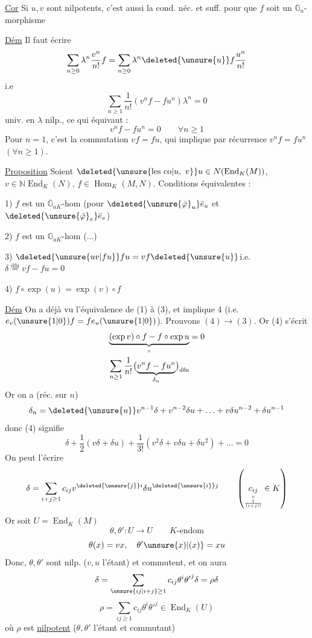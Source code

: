 \uline{Cor} Si $u,v$  sont nilpotents, c'est aussi la cond. néc. et suff. pour que $f$ soit un $\mathbb G_a$-morphisme

\uline{Dém} Il faut écrire
\[
\sum_{n\geq0}\lambda^n\frac{v^n}{n!}f
=\sum_{n\geq0}\lambda^n\deleted{\unsure{u}}f\frac{u^n}{n!}
\]
i.e
\[
\sum_{n\geq1}\frac1{n!}(v^nf-fu^n)\lambda^n=0
\]
univ. en $\lambda$ nilp., ce qui équivaut :
\[
v^nf-fu^n=0\qquad \forall n\geq1
\]
Pour $n=1$, c'est la commutation $vf=fu$, qui implique par récurrence $v^nf=fu^n$ $(\forall n\geq1)$.

\uline{Proposition} Soient $\deleted{\unsure{\text{les co}|u,\ v}}u\in N(\operatorname{End}_K(M))$, $v\in\mathbb N\operatorname{End}_K(N)$, $f\in\operatorname{Hom}_K(M,N)$. Conditions équivalentes :

1) $f$ est un $\overline{\mathbb G}_{aK}$-hom (pour  $\deleted{\unsure{\bar\varphi}_u}\bar e_u$ et $\deleted{\unsure{\bar\varphi}_v}\bar e_v$)

2) $f$ est un $\mathbb G_{aK}$-hom ($\ldots$)

3) $\deleted{\unsure{uv|fu}}fu=vf\deleted{\unsure{u}}$\quad i.e. $\delta\overset{\mathrm{dfn}}=vf-fu=0$

4) $f\circ\exp(u)=\exp(v)\circ f$

\uline{Dém} On a déjà vu l'équivalence de (1) à (3), et  implique 4 (i.e. $e_v(\unsure{1|0})f=fe_u(\unsure{1|0})$). Prouvons $(4)\longrightarrow(3)$. Or (4) s'écrit
\[
\begin{aligned}
\underbrace{(\exp v)\circ f-f\circ\exp u}_{\shortparallel}&=0\\
\sum_{n\geq1}\frac1{n!}\bigl(\underbrace{v^nf-fu^n}_{\delta_n}\bigr)_{\mathrm{dfn}}&
\end{aligned}
\]
Or on a (réc. sur $n$)
\[
\delta_n=\deleted{\unsure{u}}v^{n-1}\delta+v^{n-2}\delta u+\ldots+v\delta u^{n-2}+\delta u^{n-1}
\]
donc (4) signifie
\[
\delta+\frac12(v\delta+\delta u)+\frac1{3!}(v^2\delta+v\delta u+\delta u^2)+\ldots=0
\]
On peut l'écrire
\[
\delta=\sum_{i+j\geq1}c_{ij}v^{\deleted{\unsure{j}}i}\delta u^{\deleted{\unsure{i}}j}
\qquad\left(\underset{\substack{\shortparallel\\\frac1{(i+j)!}}}{c_{ij}}\in K\right)
\]
Or soit $U=\operatorname{End}_K(M)$
\[
\theta,\theta':U\longrightarrow U\qquad K\text{-endom}
\]
\[
\theta(x)=vx,\quad \theta'\unsure{x)|{(x)}}=xu
\]
Donc, $\theta,\theta'$ sont nilp.  ($v,u$ l'étant) et commutent, et on aura
\[
\delta=\sum_{\unsure{ij|i+j}\geq1}c_{ij}\theta^i{\theta'}^j\delta=\rho\delta
\]
\[
\rho=\sum_{ij\geq1}c_{ij}\theta^i{\theta'}^j\in\operatorname{End}_K(U)
\]
où $\rho$ est \uline{nilpotent} ($\theta,\theta'$ l'étant et commutant)

